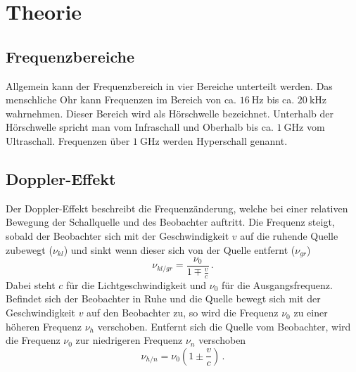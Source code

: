 \section{Theorie}

\subsection{Frequenzbereiche}
Allgemein kann der Frequenzbereich in vier Bereiche unterteilt werden.
Das menschliche Ohr kann Frequenzen im Bereich von ca. $\SI{16}{\hertz}$ bis ca. $\SI{20}{\kilo\hertz}$ wahrnehmen.
Dieser Bereich wird als Hörschwelle bezeichnet.
Unterhalb der Hörschwelle spricht man vom Infraschall und Oberhalb bis ca. $\SI{1}{\giga\hertz}$ vom Ultraschall.
Frequenzen über $\SI{1}{\giga\hertz}$ werden Hyperschall genannt.

\subsection{Doppler-Effekt}
Der Doppler-Effekt beschreibt die Frequenzänderung, welche bei einer relativen Bewegung der Schallquelle und des Beobachter auftritt.
Die Frequenz steigt, sobald der Beobachter sich mit der Geschwindigkeit $v$ auf die ruhende Quelle zubewegt ($\nu_{kl}$) und sinkt wenn dieser sich von der Quelle entfernt ($\nu_{gr}$)
\begin{equation}
    \nu_{kl/gr} = \frac{\nu_0}{1\mp \frac{v}{c}} \, .
    \label{eqn:doppler_beobachter}
\end{equation}
Dabei steht $c$ für die Lichtgeschwindigkeit und $\nu_0$ für die Ausgangsfrequenz.
\\
Befindet sich der Beobachter in Ruhe und die Quelle bewegt sich mit der Geschwindigkeit $v$ auf den Beobachter zu, so wird die Frequenz $\nu_0$ zu einer höheren Frequenz $\nu_h$ verschoben.
Entfernt sich die Quelle vom Beobachter, wird die Frequenz $\nu_0$ zur niedrigeren Frequenz $\nu_n$ verschoben
\begin{equation}
    \nu_{h/n} = \nu_0 \left ( 1 \pm \frac{v}{c}  \right ) \, .
    \label{eqn:doppler_quelle}
\end{equation}

